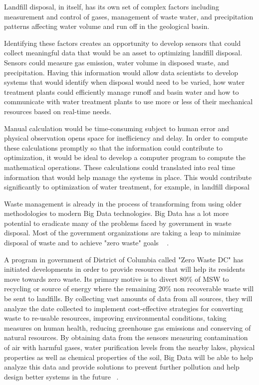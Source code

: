 \documentclass[sigconf]{acmart}
\begin{document}
Landfill disposal, in itself, has its own set of complex factors including measurement and control of gases, management of waste water, and precipitation patterns affecting water volume and run off  in the geological basin.  

Identifying these factors creates an opportunity to develop sensors that could collect meaningful data that would be an asset to optimizing landfill disposal.  Sensors could measure gas emission, water volume in disposed waste, and precipitation.  Having this information would allow data scientists to develop systems that would identify when disposal would need to be varied, how water treatment plants could efficiently manage runoff and basin water and how to communicate with water treatment plants to use more or less of their mechanical resources based on real-time needs. 

Manual calculation would be time-consuming subject to human error and physical observation opens space for inefficiency and delay.  In order to compute these calculations promptly so that the information could contribute to optimization, it would be ideal to develop a computer program to compute the mathematical operations.  These calculations could translated into real time information that would help manage the systems in place.  This would contribute significantly to optimization of water treatment, for example, in landfill disposal ~\cite{akbarpour2016}

Waste management is already in the process of transforming from using older methodologies to modern Big Data technologies. Big Data has a lot more potential to eradicate many of the problems faced by government in waste disposal. Most of the government organizations are taking a leap to minimize disposal of waste and to achieve "zero waste" goals ~\cite{rosengren2017} . 

A program in government of District of Columbia called "Zero Waste DC" has initiated developments in order to provide resources that will help its residents move towards zero waste. Its primary motive is to divert 80\% of MSW to recycling or source of energy where the remaining 20\% non recoverable waste will be sent to landfills. By collecting vast amounts of data from all sources, they will analyze  the date collected to implement cost-effective strategies for converting waste to re-usable resources, improving environmental conditions, taking measures on human health, reducing greenhouse gas emissions and conserving of natural resources. By obtaining data from the sensors measuring contamination of air with harmful gases, water purification levels from the nearby lakes, physical properties as well as chemical properties of the soil, Big Data will be able to help analyze this data and provide solutions to prevent further pollution and help design better systems in the future ~\cite{rosengren2017}.
\end{document}
